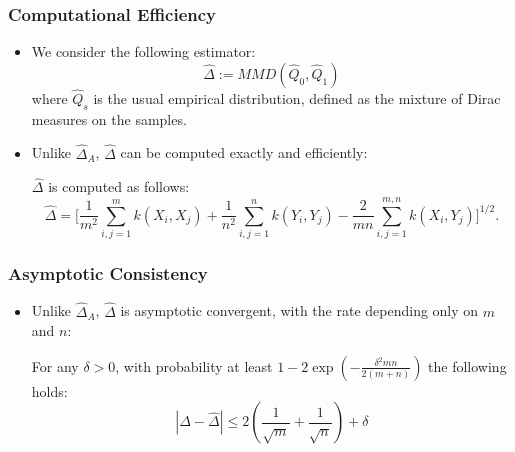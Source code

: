 \documentclass{beamer}
\begin{document}
\begin{frame}
	\frametitle{Computational Efficiency}
	\begin{itemize}
		\item We consider the following estimator:
		\begin{equation}
			\widehat{\Delta} := MMD(\hat{Q}_0, \hat{Q}_1)
		\end{equation}
		where $\hat{Q}_s$ is the usual empirical distribution, defined as the mixture of Dirac measures on the samples.
		
		\item Unlike $\widehat{\Delta}_A$, $\widehat{\Delta}$ can be computed exactly and efficiently:
		\begin{lemma}
			\label{def:lem-computable}
			$\widehat{\Delta}$ is computed as follows:
			\begin{equation}
					\widehat{\Delta} = \Bigg[ \frac{1}{m^2} \sum_{i,j = 1}^m k(X_i, X_j) + \frac{1}{n^2} \sum_{i,j = 1}^n k(Y_i, Y_j) 
					- \frac{2}{mn} \sum_{i, j = 1}^{m, n} k(X_i, Y_j) \Bigg]^{1/2}.
			\end{equation}
		\end{lemma}
	\end{itemize}
\end{frame}

\begin{frame}
	\frametitle{Asymptotic Consistency}
	\begin{itemize}
		\item Unlike $\widehat{\Delta}_A$, $\widehat{\Delta}$ is asymptotic convergent, with the rate depending only on $m$ and $n$:
		\begin{theorem}
			For any $\delta > 0$, with probability at least $1 - 2\exp\left(-\frac{\delta^2 mn}{2(m + n)}\right)$ the following holds:
			\begin{equation}
				\left| \Delta - \widehat{\Delta} \right| \leq 2 \left( \frac{1}{\sqrt{m}} + \frac{1}{\sqrt{n}} \right) + \delta
			\end{equation}
		\end{theorem}
	\end{itemize}
\end{frame}
\end{document}

